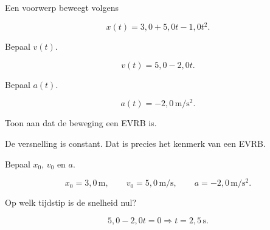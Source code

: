 \documentclass{ximera}
\begin{document}
\begin{oefening}{\oefB\ESS}

Een voorwerp beweegt volgens

\[x(t)=3,0+5,0t-1,0t^2.\]

\begin{question}

Bepaal $v(t)$.

\begin{oplossing}
\[v(t)=5,0-2,0t.\]
\end{oplossing}

\end{question}

\begin{question}

Bepaal $a(t)$.

\begin{oplossing}
\[a(t)=-2,0\,\mathrm{m/s^2}.\]
\end{oplossing}

\end{question}

\begin{question}

Toon aan dat de beweging een EVRB is.

\begin{oplossing}
De versnelling is constant. Dat is precies het kenmerk van een EVRB.
\end{oplossing}

\end{question}

\begin{question}

Bepaal $x_0$, $v_0$ en $a$.

\begin{oplossing}
\[x_0=3,0\,\mathrm{m},\qquad v_0=5,0\,\mathrm{m/s},\qquad a=-2,0\,\mathrm{m/s^2}.\]
\end{oplossing}

\end{question}

\begin{question}

Op welk tijdstip is de snelheid nul?

\begin{oplossing}
\[5,0-2,0t=0\Longrightarrow t=2,5\,\mathrm{s}.\]
\end{oplossing}

\end{question}

\end{oefening}
\end{document}
